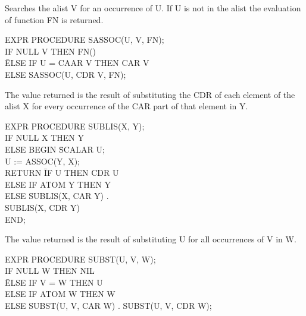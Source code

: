 \documentclass[11pt,letterpaper]{book}
\begin{document}
{Searches the alist V for an occurrence of U. If U is not in the alist
the evaluation of function FN is returned. 

{\tt \begin{tabbing} EXPR PROCEDURE SASSOC(U, V, FN); \\
\hspace*{1em} IF NULL V THEN FN() \\
\hspace*{2em} \= ELSE IF U = CAAR V THEN CAR V \\
\> ELSE SASSOC(U, CDR V, FN);
\end{tabbing}}}

{The value returned is the result of substituting the CDR of each
element of the alist X for every occurrence of the CAR part of that
element in Y. 

{\tt \begin{tabbing} EXPR PROCEDURE SUBLIS(X, Y); \\
\hspace*{1em}IF NULL X THEN Y \\
\hspace*{2em} ELSE BEGIN \= SCALAR U; \\
\> U := ASSOC(Y, X); \\
\> RETURN \= IF U THEN CDR U \\
\> \> ELSE IF ATOM Y THEN Y \\
\> \> ELSE \= SUBLIS(X, CAR Y) . \\
\> \> \> SUBLIS(X, CDR Y) \\
\> END;
\end{tabbing}}}

{The value returned is the result of substituting U for all
occurrences of V in W. 

{\tt \begin{tabbing} EXPR PROCEDURE SUBST(U, V, W); \\
\hspace*{1em} IF NULL W THEN NIL \\
\hspace*{2em} \= ELSE IF V = W THEN U \\
\> ELSE IF ATOM W THEN W \\
\> ELSE SUBST(U, V, CAR W) . SUBST(U, V, CDR W);
\end{tabbing}}}
\end{document}
